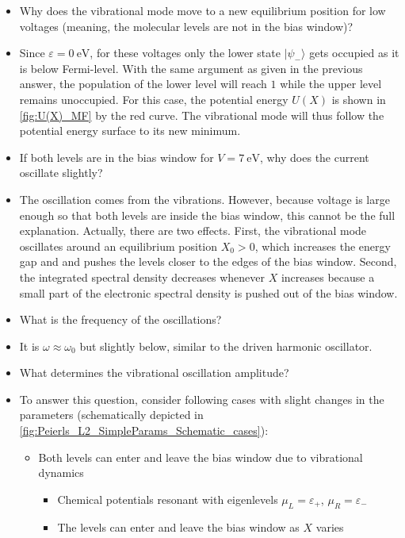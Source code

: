 \documentclass{article}
\begin{document}
\begin{itemize}
\begin{figure}[!h]
{		}\label{fig:Current_processes_N}
	\end{figure}
	\item[Q:] Why does the vibrational mode move to a new equilibrium position for low voltages (meaning, the molecular levels are not in the bias window)?
	\item[A:] Since $\varepsilon=\SI{0}{\electronvolt}$, for these voltages only the lower state $\vert \psi_-\rangle$ gets occupied as it is below Fermi-level. With the same argument as given in the previous answer, the population of the lower level will reach $1$ while the upper level remains unoccupied. For this case, the potential energy $U(X)$ is shown in \cref{fig:U(X)_MF} by the red curve. The vibrational mode will thus follow the potential energy surface to its new minimum. 
	\item[Q:] If both levels are in the bias window for $V=\SI{7}{\electronvolt}$, why does the current oscillate slightly?
	\item[A:] The oscillation comes from the vibrations. However, because voltage is large enough so that both levels are inside the bias window, this cannot be the full explanation. Actually, there are two effects. First, the vibrational mode oscillates around an equilibrium position $X_0> 0$, which increases the energy gap and and pushes the levels closer to the edges of the bias window. 
	Second, the integrated spectral density decreases whenever $X$ increases because a small part of the electronic spectral density is pushed out of the bias window. 
	\item[Q:] What is the frequency of the oscillations?
	\item[A:] It is $\omega\approx \omega_0$ but slightly below, similar to the driven harmonic oscillator.
	\item[Q:] What determines the vibrational oscillation amplitude?
	\item[A:] To answer this question, consider following cases with slight changes in the parameters (schematically depicted in \cref{fig:Peierls_L2_SimpleParams_Schematic_cases}):
	\begin{itemize}
		\item[(i)] Both levels can enter and leave the bias window due to vibrational dynamics
		\begin{itemize}
			\item Chemical potentials resonant with eigenlevels $\mu_L=\varepsilon_+$, $\mu_R= \varepsilon_-$
			\item The levels can enter and leave the bias window as $X$ varies

\end{itemize}
\end{itemize}
\end{itemize}
\end{document}
